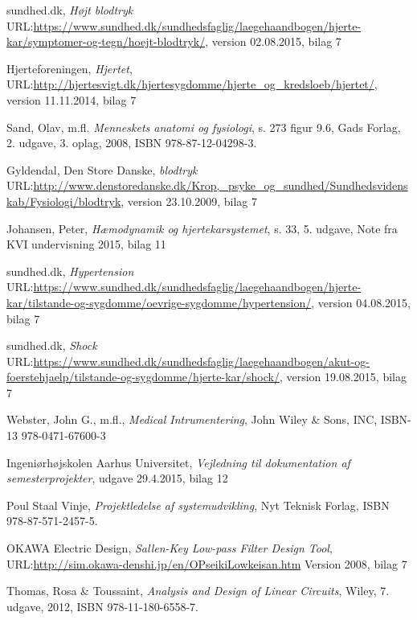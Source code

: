 \begin{thebibliography}{9}
	
	sundhed.dk,
	\emph{Højt blodtryk}
	URL:\url{https://www.sundhed.dk/sundhedsfaglig/laegehaandbogen/hjerte-kar/symptomer-og-tegn/hoejt-blodtryk/},
	version 02.08.2015,
	bilag 7
	
	
	 
	Hjerteforeningen,
	\emph{Hjertet},
	URL:\url{http://hjertesvigt.dk/hjertesygdomme/hjerte_og_kredsloeb/hjertet/},
	version 11.11.2014,
	bilag 7
	
	Sand, Olav, m.fl.
	\emph{Menneskets anatomi og fysiologi},
	s. 273 figur 9.6,
	Gads Forlag,
	2. udgave, 3. oplag,
	2008, ISBN 978-87-12-04298-3. 
	
	Gyldendal, Den Store Danske,
	\emph{blodtryk}
	URL:\url{http://www.denstoredanske.dk/Krop,_psyke_og_sundhed/Sundhedsvidenskab/Fysiologi/blodtryk},
	version 23.10.2009, 
	bilag 7
	
	Johansen, Peter,
	\emph{Hæmodynamik og hjertekarsystemet},
	s. 33,
	5. udgave,
	Note fra KVI undervisning 2015,
	bilag 11
	
	sundhed.dk,
	\emph{Hypertension}
	URL:\url{https://www.sundhed.dk/sundhedsfaglig/laegehaandbogen/hjerte-kar/tilstande-og-sygdomme/oevrige-sygdomme/hypertension/},
	version 04.08.2015,
	bilag 7
	
	sundhed.dk,
	\emph{Shock}
	URL:\url{https://www.sundhed.dk/sundhedsfaglig/laegehaandbogen/akut-og-foerstehjaelp/tilstande-og-sygdomme/hjerte-kar/shock/},
	version 19.08.2015,
	bilag 7
	
	Webster, John G., m.fl.,
	\emph{Medical Intrumentering},
	John Wiley \& Sons, INC, ISBN-13 978-0471-67600-3
	 
	Ingeniørhøjskolen Aarhus Universitet,
	\emph{Vejledning til dokumentation af semesterprojekter},
	udgave 29.4.2015,
	bilag 12
	
	
	Poul Staal Vinje,
	\emph{Projektledelse af systemudvikling},
	Nyt Teknisk Forlag,
	ISBN 978-87-571-2457-5.
	
	OKAWA Electric Design,
	\emph{Sallen-Key Low-pass Filter Design Tool},
	URL:\url{http://sim.okawa-denshi.jp/en/OPseikiLowkeisan.htm}
	Version 2008,
	bilag 7
	
	
	Thomas, Rosa \& Toussaint,
	\emph{Analysis and Design of Linear Circuits},
	Wiley,
	7. udgave, 
	2012, ISBN  978-11-180-6558-7. 
	
	
\end{thebibliography}



